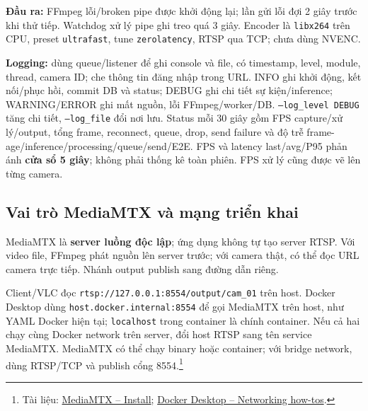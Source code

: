 \documentclass[10pt,a4paper]{article}
\begin{document}
\textbf{Đầu ra:} FFmpeg lỗi/broken pipe được khởi động lại; lần gửi lỗi đợi
2 giây trước khi thử tiếp. Watchdog xử lý pipe ghi treo quá 3 giây.
Encoder là \texttt{libx264} trên CPU, preset \texttt{ultrafast},
tune \texttt{zerolatency}, RTSP qua TCP; chưa dùng NVENC.

\textbf{Logging:} dùng queue/listener để ghi console và file, có timestamp,
level, module, thread, camera ID; che thông tin đăng nhập trong URL.
INFO ghi khởi động, kết nối/phục hồi, commit DB và status; DEBUG ghi chi tiết
sự kiện/inference; WARNING/ERROR ghi mất nguồn, lỗi FFmpeg/worker/DB.
\texttt{--log\_level DEBUG} tăng chi tiết, \texttt{--log\_file} đổi nơi lưu.
Status mỗi 30 giây gồm FPS capture/xử lý/output, tổng frame, reconnect, queue,
drop, send failure và độ trễ frame-age/inference/processing/queue/send/E2E.
FPS và latency last/avg/P95 phản ánh \textbf{cửa sổ 5 giây}; không phải thống kê
toàn phiên. FPS xử lý cũng được vẽ lên từng camera.

\subsection*{Vai trò MediaMTX và mạng triển khai}
MediaMTX là \textbf{server luồng độc lập}; ứng dụng không tự tạo server RTSP.
Với video file, FFmpeg phát nguồn lên server trước; với camera thật, có thể
đọc URL camera trực tiếp. Nhánh output publish sang đường dẫn riêng.
\begin{center}
\end{center}
Client/VLC đọc \texttt{rtsp://127.0.0.1:8554/output/cam\_01} trên host.
Docker Desktop dùng \texttt{host.docker.internal:8554} để gọi MediaMTX trên host,
như YAML Docker hiện tại; \texttt{localhost} trong container là chính container.
Nếu cả hai chạy cùng Docker network trên server, đổi host RTSP sang tên service
MediaMTX. MediaMTX có thể chạy binary hoặc container; với bridge network, dùng
RTSP/TCP và publish cổng 8554.\footnote{Tài liệu:
\href{https://mediamtx.org/docs/kickoff/install}{MediaMTX -- Install};
\href{https://docs.docker.com/desktop/features/networking/networking-how-tos/}
{Docker Desktop -- Networking how-tos}.}
\end{document}
